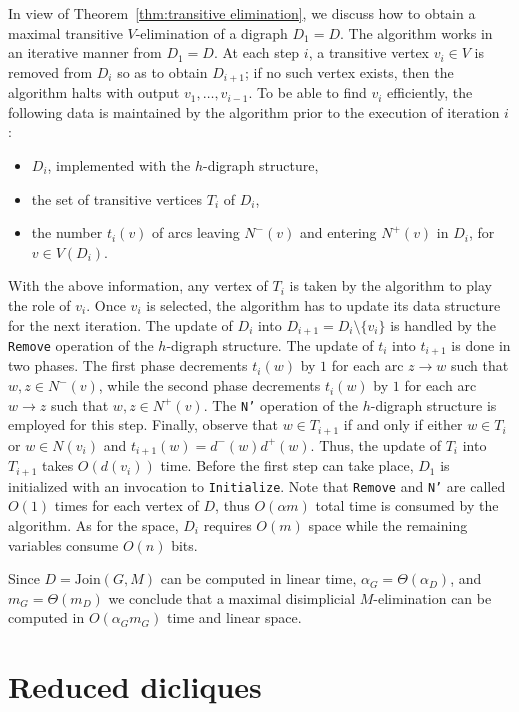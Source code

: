 \documentclass[a4paper,11pt]{article}
\newcommand{\JOIN}{\ensuremath{\mathrm{Join}}}
\begin{document}
In view of Theorem~\ref{thm:transitive elimination}, we discuss how to obtain a maximal transitive $V$-elimination of a digraph $D_1 = D$.  The algorithm works in an iterative manner from $D_1 = D$.  At each step $i$, a transitive vertex $v_i \in V$ is removed from $D_i$ so as to obtain $D_{i+1}$; if no such vertex exists, then the algorithm halts with output $v_1, \ldots, v_{i-1}$.  To be able to find $v_i$ efficiently, the following data is maintained by the algorithm prior to the execution of iteration $i$:
\begin{itemize}
 \item $D_i$, implemented with the $h$-digraph structure,
 \item the set of transitive vertices $T_i$ of $D_i$,
 \item the number $t_i(v)$ of arcs leaving $N^-(v)$ and entering $N^+(v)$ in $D_i$, for $v \in V(D_i)$.
\end{itemize}
With the above information, any vertex of $T_i$ is taken by the algorithm to play the role of $v_i$. Once $v_i$ is selected, the algorithm has to update its data structure for the next iteration.  The update of $D_i$ into $D_{i+1}= D_i \setminus \{v_i\}$ is handled by the \texttt{Remove} operation of the $h$-digraph structure.  The update of $t_i$ into $t_{i+1}$ is done in two phases.  The first phase decrements $t_i(w)$ by $1$ for each arc $z \to w$ such that $w, z \in N^-(v)$, while the second phase decrements $t_i(w)$ by $1$ for each arc $w \to z$ such that $w,z \in N^+(v)$.  The \texttt{N'} operation of the $h$-digraph structure is employed for this step.  Finally, observe that $w \in T_{i+1}$ if and only if either $w \in T_i$ or $w \in N(v_i)$ and $t_{i+1}(w) = d^-(w)d^+(w)$.  Thus, the update of $T_i$ into $T_{i+1}$ takes $O(d(v_i))$ time.  Before the first step can take place, $D_1$ is initialized with an invocation to \texttt{Initialize}.  Note that \texttt{Remove} and \texttt{N'} are called $O(1)$ times for each vertex of $D$, thus $O(\alpha m)$ total time is consumed by the algorithm.  As for the space, $D_i$ requires $O(m)$ space while the remaining variables consume $O(n)$ bits.

Since $D = \JOIN(G, M)$ can be computed in linear time, $\alpha_G = \Theta(\alpha_D)$, and $m_G = \Theta(m_D)$ we conclude that a maximal disimplicial $M$-elimination can be computed in $O(\alpha_G m_G)$ time and linear space.

\section{Reduced dicliques}
\label{sec:WDI and DI}
\end{document}
